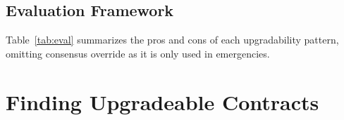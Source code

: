 %




\subsection{Evaluation Framework}


Table~\ref{tab:eval} summarizes the pros and cons of each upgradability pattern, omitting consensus override as it is only used in emergencies. %






 \section{Finding Upgradeable Contracts} 
 \label{sec:proxyFinding}
 
